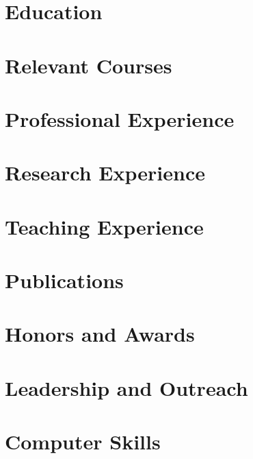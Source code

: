 \documentclass[letterpaper,11pt]{article}
\begin{document}
    

%     

\section{Education}
    

\section{Relevant Courses}
    

\section{Professional Experience}
    
    
    

\section{Research Experience}
    
    

\section{Teaching Experience}
    
    
    
    

\section{Publications}
    

\section{Honors and Awards}
    

\section{Leadership and Outreach}
    

\section{Computer Skills}
    
    
    
\end{document}
